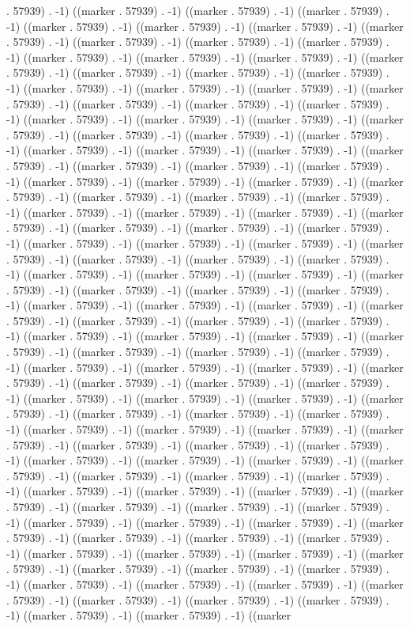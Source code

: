 . 57939) . -1) ((marker . 57939) . -1) ((marker . 57939) . -1) ((marker . 57939) . -1) ((marker . 57939) . -1) ((marker . 57939) . -1) ((marker . 57939) . -1) ((marker . 57939) . -1) ((marker . 57939) . -1) ((marker . 57939) . -1) ((marker . 57939) . -1) ((marker . 57939) . -1) ((marker . 57939) . -1) ((marker . 57939) . -1) ((marker . 57939) . -1) ((marker . 57939) . -1) ((marker . 57939) . -1) ((marker . 57939) . -1) ((marker . 57939) . -1) ((marker . 57939) . -1) ((marker . 57939) . -1) ((marker . 57939) . -1) ((marker . 57939) . -1) ((marker . 57939) . -1) ((marker . 57939) . -1) ((marker . 57939) . -1) ((marker . 57939) . -1) ((marker . 57939) . -1) ((marker . 57939) . -1) ((marker . 57939) . -1) ((marker . 57939) . -1) ((marker . 57939) . -1) ((marker . 57939) . -1) ((marker . 57939) . -1) ((marker . 57939) . -1) ((marker . 57939) . -1) ((marker . 57939) . -1) ((marker . 57939) . -1) ((marker . 57939) . -1) ((marker . 57939) . -1) ((marker . 57939) . -1) ((marker . 57939) . -1) ((marker . 57939) . -1) ((marker . 57939) . -1) ((marker . 57939) . -1) ((marker . 57939) . -1) ((marker . 57939) . -1) ((marker . 57939) . -1) ((marker . 57939) . -1) ((marker . 57939) . -1) ((marker . 57939) . -1) ((marker . 57939) . -1) ((marker . 57939) . -1) ((marker . 57939) . -1) ((marker . 57939) . -1) ((marker . 57939) . -1) ((marker . 57939) . -1) ((marker . 57939) . -1) ((marker . 57939) . -1) ((marker . 57939) . -1) ((marker . 57939) . -1) ((marker . 57939) . -1) ((marker . 57939) . -1) ((marker . 57939) . -1) ((marker . 57939) . -1) ((marker . 57939) . -1) ((marker . 57939) . -1) ((marker . 57939) . -1) ((marker . 57939) . -1) ((marker . 57939) . -1) ((marker . 57939) . -1) ((marker . 57939) . -1) ((marker . 57939) . -1) ((marker . 57939) . -1) ((marker . 57939) . -1) ((marker . 57939) . -1) ((marker . 57939) . -1) ((marker . 57939) . -1) ((marker . 57939) . -1) ((marker . 57939) . -1) ((marker . 57939) . -1) ((marker . 57939) . -1) ((marker . 57939) . -1) ((marker . 57939) . -1) ((marker . 57939) . -1) ((marker . 57939) . -1) ((marker . 57939) . -1) ((marker . 57939) . -1) ((marker . 57939) . -1) ((marker . 57939) . -1) ((marker . 57939) . -1) ((marker . 57939) . -1) ((marker . 57939) . -1) ((marker . 57939) . -1) ((marker . 57939) . -1) ((marker . 57939) . -1) ((marker . 57939) . -1) ((marker . 57939) . -1) ((marker . 57939) . -1) ((marker . 57939) . -1) ((marker . 57939) . -1) ((marker . 57939) . -1) ((marker . 57939) . -1) ((marker . 57939) . -1) ((marker . 57939) . -1) ((marker . 57939) . -1) ((marker . 57939) . -1) ((marker . 57939) . -1) ((marker . 57939) . -1) ((marker . 57939) . -1) ((marker . 57939) . -1) ((marker . 57939) . -1) ((marker . 57939) . -1) ((marker . 57939) . -1) ((marker . 57939) . -1) ((marker . 57939) . -1) ((marker . 57939) . -1) ((marker . 57939) . -1) ((marker . 57939) . -1) ((marker . 57939) . -1) ((marker . 57939) . -1) ((marker . 57939) . -1) ((marker . 57939) . -1) ((marker . 57939) . -1) ((marker . 57939) . -1) ((marker . 57939) . -1) ((marker . 57939) . -1) ((marker . 57939) . -1) ((marker . 57939) . -1) ((marker . 57939) . -1) ((marker . 57939) . -1) ((marker . 57939) . -1) ((marker . 57939) . -1) ((marker . 57939) . -1) ((marker . 57939) . -1) ((marker . 57939) . -1) ((marker . 57939) . -1) ((marker . 57939) . -1) ((marker . 57939) . -1) ((marker 